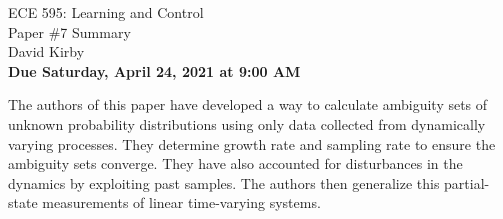 \documentclass[11pt]{article}
\begin{document}
\begin{center}
\LARGE{ECE 595: Learning and Control\\Paper \#7 Summary}\\[1.5em]
\large David Kirby\\[1.5em]
\large \textbf{Due Saturday, April 24, 2021 at 9:00 AM}\\[2.5em]
\end{center}

\noindent The authors of this paper have developed a way to calculate ambiguity sets of unknown probability distributions using only data collected from dynamically varying processes. They determine growth rate and sampling rate to ensure the ambiguity sets converge. They have also accounted for disturbances in the dynamics by exploiting past samples. The authors then generalize this partial-state measurements of linear time-varying systems.
\end{document}
